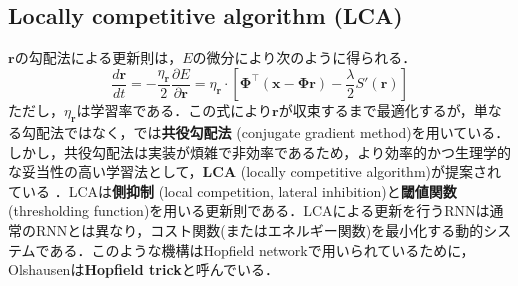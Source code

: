 \subsection{Locally competitive algorithm (LCA) }
$\mathbf{r}$の勾配法による更新則は，$E$の微分により次のように得られる．
\begin{equation}
\frac{d \mathbf{r}}{dt}= -\frac{\eta_\mathbf{r}}{2}\frac{\partial E}{\partial \mathbf{r}}=\eta_\mathbf{r} \cdot\left[\mathbf{\Phi}^\top (\mathbf{x}-\mathbf{\Phi}\mathbf{r})- \frac{\lambda}{2}S'\left(\mathbf{r}\right)\right]
\end{equation}
ただし，$\eta_{\mathbf{r}}$は学習率である．この式により$\mathbf{r}$が収束するまで最適化するが，単なる勾配法ではなく，\citep{Olshausen1996-xe}では\textbf{共役勾配法} (conjugate gradient method)を用いている．しかし，共役勾配法は実装が煩雑で非効率であるため，より効率的かつ生理学的な妥当性の高い学習法として，\textbf{LCA}  (locally competitive algorithm)が提案されている \citep{Rozell2008-wp}．LCAは\textbf{側抑制} (local competition, lateral inhibition)と\textbf{閾値関数} (thresholding function)を用いる更新則である．LCAによる更新を行うRNNは通常のRNNとは異なり，コスト関数(またはエネルギー関数)を最小化する動的システムである．このような機構はHopfield networkで用いられているために，Olshausenは\textbf{Hopfield trick}と呼んでいる．
